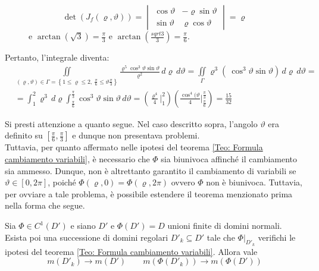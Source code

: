 \begin{example}
\begin{figure}[H]
\begin{minipage}{0.55\textwidth}
\begin{equation*}
        \det\left(J_f(\varrho, \vartheta)\right)=\begin{vmatrix}
        \cos \vartheta & -\varrho \sin\vartheta\\
        \sin \vartheta & \varrho \cos\vartheta    
        \end{vmatrix}= \varrho
    \end{equation*}
    e $\arctan(\sqrt{3})= \tfrac{\pi}{3}$ e $\arctan(\tfrac{sqrt{3}}{3})=\tfrac{\pi}{6}$.
    \end{minipage}
\end{figure}
Pertanto, l'integrale diventa:
\begin{align*}
    &\iint\limits_{(\varrho, \vartheta) \in \Gamma=\left\{ 1 \leq \varrho \leq 2,\ \frac{\pi}{6} \leq \vartheta \frac{\pi}{3}\right\}}{\frac{\varrho^5 \cos^3 \vartheta \sin \vartheta}{\varrho^2}\,d\varrho\,d\vartheta}=\iint\limits_{\Gamma}{\varrho^3\left(\ \cos^3 \vartheta \sin \vartheta \right)\, d\varrho\,d\vartheta }=\\
    &=\int_{1}^{2}{\varrho^3\, d\varrho} \int_{\frac{\pi}{6}}^{\frac{\pi}{3}}{\cos^3\vartheta \sin \vartheta \, d\vartheta} = \left(\frac{\varrho^4}{4}\Big|_{1}^{2}\right)\left(\frac{\cos^4(\vartheta}{4}\Big|_{\frac{\pi}{6}}^\frac{\pi}{3}\right)= \frac{15}{32}
    \end{align*}
\end{example}
Si presti attenzione a quanto segue. Nel caso descritto sopra, l'angolo $\vartheta$ era definito su $\left[\tfrac{\pi}{6}, \tfrac{\pi}{3}\right]$ e dunque non presentava problemi.\\
Tuttavia, per quanto affermato nelle ipotesi del teorema \ref{Teo: Formula cambiamento variabili}, è necessario che $\Phi$ sia biunivoca affinché il cambiamento sia ammesso. Dunque, non è altrettanto garantito il cambiamento di variabili se $\vartheta \in [0, 2\pi]$, poiché $\Phi(\varrho, 0)=\Phi(\varrho, 2\pi)$ ovvero $\Phi$ non è biunivoca.
Tuttavia, per ovviare a tale problema, è possibile estendere il teorema menzionato prima nella forma che segue.
\begin{theorem}
    Sia $\Phi \in C^1(D')$ e siano $D'$ e $\Phi(D')=D$ unioni finite di domini normali. Esista poi una successione di domini regolari $D'_k \subseteq D'$ tale che $\Phi\big|_{D'_k}$ verifichi le ipotesi del teorema \ref{Teo: Formula cambiamento variabili}. Allora vale
    \begin{equation}
        m(D'_k) \to m(D') \qquad m(\Phi(D'_k)) \to m(\Phi(D'))
    \end{equation}
\end{theorem}
